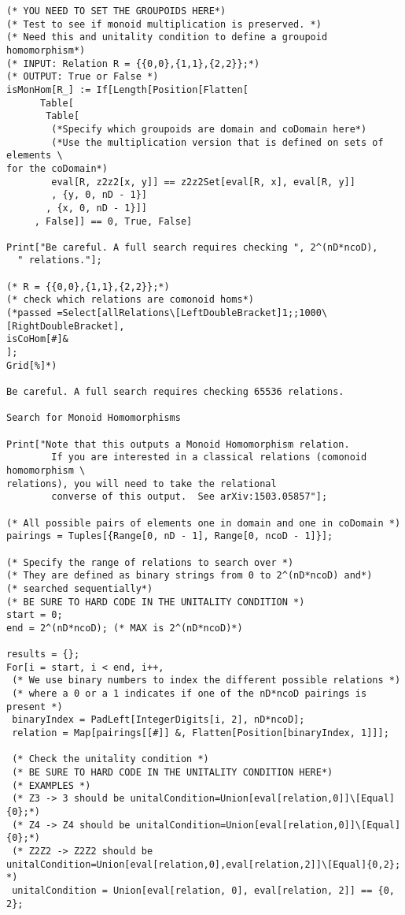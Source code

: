 \begin{lstlisting}
(* YOU NEED TO SET THE GROUPOIDS HERE*)
(* Test to see if monoid multiplication is preserved. *)
(* Need this and unitality condition to define a groupoid homomorphism*)
(* INPUT: Relation R = {{0,0},{1,1},{2,2}};*)
(* OUTPUT: True or False *)
isMonHom[R_] := If[Length[Position[Flatten[
      Table[
       Table[
        (*Specify which groupoids are domain and coDomain here*)
        (*Use the multiplication version that is defined on sets of elements \
for the coDomain*)
        eval[R, z2z2[x, y]] == z2z2Set[eval[R, x], eval[R, y]]
        , {y, 0, nD - 1}]
       , {x, 0, nD - 1}]]
     , False]] == 0, True, False]

Print["Be careful. A full search requires checking ", 2^(nD*ncoD), 
  " relations."];

(* R = {{0,0},{1,1},{2,2}};*)
(* check which relations are comonoid homs*)
(*passed =Select[allRelations\[LeftDoubleBracket]1;;1000\[RightDoubleBracket],
isCoHom[#]&
];
Grid[%]*)

Be careful. A full search requires checking 65536 relations.

Search for Monoid Homomorphisms

Print["Note that this outputs a Monoid Homomorphism relation.
        If you are interested in a classical relations (comonoid homomorphism \
relations), you will need to take the relational 
        converse of this output.  See arXiv:1503.05857"];

(* All possible pairs of elements one in domain and one in coDomain *)
pairings = Tuples[{Range[0, nD - 1], Range[0, ncoD - 1]}];

(* Specify the range of relations to search over *)
(* They are defined as binary strings from 0 to 2^(nD*ncoD) and*)
(* searched sequentially*)
(* BE SURE TO HARD CODE IN THE UNITALITY CONDITION *)
start = 0;
end = 2^(nD*ncoD); (* MAX is 2^(nD*ncoD)*)

results = {};
For[i = start, i < end, i++,
 (* We use binary numbers to index the different possible relations *)
 (* where a 0 or a 1 indicates if one of the nD*ncoD pairings is present *)
 binaryIndex = PadLeft[IntegerDigits[i, 2], nD*ncoD];
 relation = Map[pairings[[#]] &, Flatten[Position[binaryIndex, 1]]];
 
 (* Check the unitality condition *)
 (* BE SURE TO HARD CODE IN THE UNITALITY CONDITION HERE*)
 (* EXAMPLES *)
 (* Z3 -> 3 should be unitalCondition=Union[eval[relation,0]]\[Equal]{0};*)
 (* Z4 -> Z4 should be unitalCondition=Union[eval[relation,0]]\[Equal]{0};*)
 (* Z2Z2 -> Z2Z2 should be unitalCondition=Union[eval[relation,0],eval[relation,2]]\[Equal]{0,2}; *)
 unitalCondition = Union[eval[relation, 0], eval[relation, 2]] == {0, 2};
 

\end{lstlisting}
